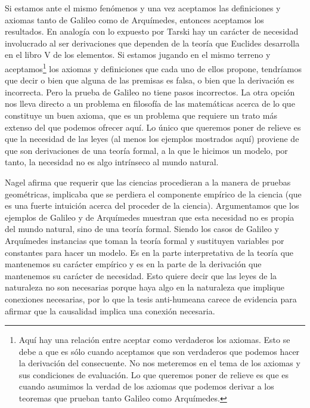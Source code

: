 Si estamos ante el mismo fenómenos y una vez aceptamos las definiciones y axiomas tanto de Galileo como de Arquímedes, entonces aceptamos los resultados. En analogía con lo expuesto por Tarski hay un carácter de necesidad involucrado al ser derivaciones que dependen de la teoría que Euclides desarrolla en el libro V de los elementos. Si estamos jugando en el mismo terreno y aceptamos\footnote{Aquí hay una relación entre aceptar como verdaderos los axiomas. Esto se debe a que es sólo cuando aceptamos que son verdaderos que podemos hacer la derivación del consecuente. No nos meteremos en el tema de los axiomas y sus condiciones de evaluación. Lo que queremos poner de relieve es que es cuando asumimos la verdad de los axiomas que podemos derivar a los teoremas que prueban tanto Galileo como Arquímedes.} los axiomas y definiciones que cada uno de ellos propone, tendríamos que decir o bien que alguna de las premisas es falsa, o bien que la derivación es incorrecta. Pero la prueba de Galileo no tiene pasos incorrectos. La otra opción nos lleva directo a un problema en filosofía de las matemáticas acerca de lo que constituye un buen axioma, que es un problema que requiere un trato más extenso del que podemos ofrecer aquí. Lo único que queremos poner de relieve es que la necesidad de las leyes (al menos los ejemplos mostrados aquí) proviene de que son derivaciones de una teoría formal, a la que le hicimos un modelo, por tanto, la necesidad no es algo intrínseco al mundo natural.


Nagel afirma que requerir que las ciencias procedieran a la manera de pruebas geométricas, implicaba que se perdiera el componente empírico de la ciencia (que es una fuerte intuición acerca del proceder de la ciencia). Argumentamos que los ejemplos de Galileo y de Arquímedes muestran que esta necesidad no es propia del mundo natural, sino de una teoría formal. Siendo los casos de Galileo y Arquímedes instancias que toman la teoría formal y sustituyen variables por constantes para hacer un modelo. Es en la parte interpretativa de la teoría que mantenemos su carácter empírico y es en la parte de la derivación que mantenemos su carácter de necesidad. Esto quiere decir que las leyes de la naturaleza no son necesarias porque haya algo en la naturaleza que implique conexiones necesarias, por lo que la tesis anti-humeana carece de evidencia para afirmar que la causalidad implica una conexión necesaria.

